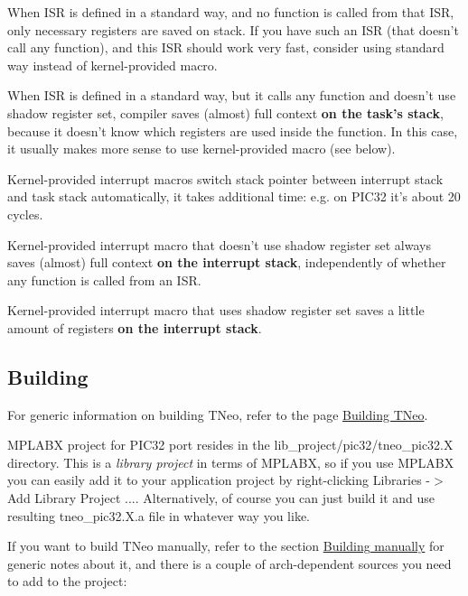 \begin{DoxyItemize}
\item When I\+S\+R is defined in a standard way, and no function is called from that I\+S\+R, only necessary registers are saved on stack. If you have such an I\+S\+R (that doesn't call any function), and this I\+S\+R should work very fast, consider using standard way instead of kernel-\/provided macro.
\item When I\+S\+R is defined in a standard way, but it calls any function and doesn't use shadow register set, compiler saves (almost) full context {\bfseries on the task's stack}, because it doesn't know which registers are used inside the function. In this case, it usually makes more sense to use kernel-\/provided macro (see below).
\item Kernel-\/provided interrupt macros switch stack pointer between interrupt stack and task stack automatically, it takes additional time\+: e.\+g. on P\+I\+C32 it's about 20 cycles.
\item Kernel-\/provided interrupt macro that doesn't use shadow register set always saves (almost) full context {\bfseries on the interrupt stack}, independently of whether any function is called from an I\+S\+R.
\item Kernel-\/provided interrupt macro that uses shadow register set saves a little amount of registers {\bfseries on the interrupt stack}.
\end{DoxyItemize}\hypertarget{arch_specific_pic32_building}{}\subsection{Building}\label{arch_specific_pic32_building}
For generic information on building T\+Neo, refer to the page \hyperlink{building}{Building T\+Neo}.

M\+P\+L\+A\+B\+X project for P\+I\+C32 port resides in the {\ttfamily lib\+\_\+project/pic32/tneo\+\_\+pic32.\+X} directory. This is a {\itshape library project} in terms of M\+P\+L\+A\+B\+X, so if you use M\+P\+L\+A\+B\+X you can easily add it to your application project by right-\/clicking {\ttfamily Libraries -\/$>$ Add Library Project ...}. Alternatively, of course you can just build it and use resulting {\ttfamily tneo\+\_\+pic32.\+X.\+a} file in whatever way you like.

If you want to build T\+Neo manually, refer to the section \hyperlink{building_building_generic__manual}{Building manually} for generic notes about it, and there is a couple of arch-\/dependent sources you need to add to the project\+:


